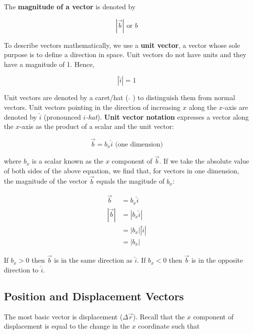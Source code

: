         \noindent The \textbf{magnitude of a vector} is denoted by

        \[
            |\overrightarrow{b}| \text{ or } b
        \]

        \pagebreak

        \noindent To describe vectors mathematically, we use a \textbf{unit vector}, a vector whose sole purpose is to define a direction in space. Unit vectors do not have units and they have a magnitude of 1. Hence,

        \[
            |\hat{i}| = 1
        \]

        \noindent Unit vectors are denoted by a caret/hat ( $\hat{ }$ ) to distinguish them from normal vectors. Unit vectors pointing in the direction of increasing $x$ along the $x$-axis are denoted by
        $\hat{i}$ (pronounced \textit{$i$-hat}). \textbf{Unit vector notation} expresses a vector along the $x$-axis as the product of a scalar and the unit vector:

        \[
            \overrightarrow{b} = b_x \hat{i} \text{  (one dimension)}
        \]

        \noindent where $b_x$ is a scalar known as the $x$ component of $\overrightarrow{b}$. If we take the absolute value of both sides of the above equation, we find that, for vectors in one dimension, the magnitude
        of the vector $\overrightarrow{b}$ equals the magitude of $b_x$:

        \begin{align*}
            \overrightarrow{b}      &= b_x \hat{i} \\
            |\overrightarrow{b}|    &= |b_x \hat{i}| \\
                                    &= |b_x||\hat{i}| \\
                                    &= |b_x|
        \end{align*}

        \noindent If $b_x > 0$ then $\overrightarrow{b}$ is in the same direction as $\hat{i}$. If $b_x < 0$ then $\overrightarrow{b}$ is in the opposite direction to $\hat{i}$.



    \subsection{Position and Displacement Vectors}
        The most basic vector is displacement ($\Delta \overrightarrow{r}$). Recall that the $x$ component of displacement is equal to the change in the $x$ coordinate such that

